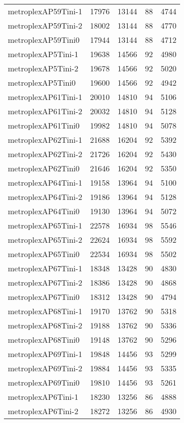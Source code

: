 \begin{longtable}{lrrrr}
metroplexAP59Tini-1 & 17976 & 13144 & 88 & 4744 \\
metroplexAP59Tini-2 & 18002 & 13144 & 88 & 4770 \\
metroplexAP59Tini0 & 17944 & 13144 & 88 & 4712 \\
metroplexAP5Tini-1 & 19638 & 14566 & 92 & 4980 \\
metroplexAP5Tini-2 & 19678 & 14566 & 92 & 5020 \\
metroplexAP5Tini0 & 19600 & 14566 & 92 & 4942 \\
metroplexAP61Tini-1 & 20010 & 14810 & 94 & 5106 \\
metroplexAP61Tini-2 & 20032 & 14810 & 94 & 5128 \\
metroplexAP61Tini0 & 19982 & 14810 & 94 & 5078 \\
metroplexAP62Tini-1 & 21688 & 16204 & 92 & 5392 \\
metroplexAP62Tini-2 & 21726 & 16204 & 92 & 5430 \\
metroplexAP62Tini0 & 21646 & 16204 & 92 & 5350 \\
metroplexAP64Tini-1 & 19158 & 13964 & 94 & 5100 \\
metroplexAP64Tini-2 & 19186 & 13964 & 94 & 5128 \\
metroplexAP64Tini0 & 19130 & 13964 & 94 & 5072 \\
metroplexAP65Tini-1 & 22578 & 16934 & 98 & 5546 \\
metroplexAP65Tini-2 & 22624 & 16934 & 98 & 5592 \\
metroplexAP65Tini0 & 22534 & 16934 & 98 & 5502 \\
metroplexAP67Tini-1 & 18348 & 13428 & 90 & 4830 \\
metroplexAP67Tini-2 & 18386 & 13428 & 90 & 4868 \\
metroplexAP67Tini0 & 18312 & 13428 & 90 & 4794 \\
metroplexAP68Tini-1 & 19170 & 13762 & 90 & 5318 \\
metroplexAP68Tini-2 & 19188 & 13762 & 90 & 5336 \\
metroplexAP68Tini0 & 19148 & 13762 & 90 & 5296 \\
metroplexAP69Tini-1 & 19848 & 14456 & 93 & 5299 \\
metroplexAP69Tini-2 & 19884 & 14456 & 93 & 5335 \\
metroplexAP69Tini0 & 19810 & 14456 & 93 & 5261 \\
metroplexAP6Tini-1 & 18230 & 13256 & 86 & 4888 \\
metroplexAP6Tini-2 & 18272 & 13256 & 86 & 4930 \\

\end{longtable}
